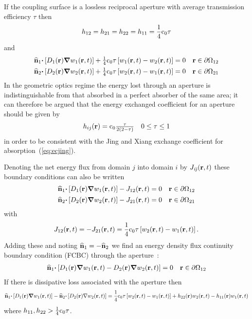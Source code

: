 \documentclass[a4paper]{article}
\numberwithin{equation}{section}
\begin{document}
If the coupling surface is a lossless reciprocal aperture with average
transmission efficiency $\tau$ then
\begin{align}
h_{12} = h_{21} = h_{22} = h_{11} = \frac{1}{4}\rc_0\tau
\end{align}
and
\begin{align}
\begin{matrix}
\uvn_1{\vcdot}\left[D_1\pr{\vnabla}w_1\prt\right]+\frac{1}{4}\rc_0\tau\left[w_1\prt-w_2\prt\right]=0 &\vr\in\partial\Omega_{12}
\end{matrix}\\
\begin{matrix}
\uvn_2{\vcdot}\left[D_2\pr{\vnabla}w_2\prt\right]+\frac{1}{4}\rc_0\tau\left[w_2\prt-w_1\prt\right]=0 &\vr\in\partial\Omega_{21}
\end{matrix}
\end{align}
In the geometric optics regime the energy lost through an aperture is indistinguishable from that
absorbed in a perfect absorber of the same area; it can therefore be argued that the energy
exchanged coefficient for an aperture should be given by
\begin{align}
\begin{matrix}
h_{ij}\pr = \rc_0\frac{\tau}{2\left(2-\tau\right)} &0\leq\tau\leq 1
\end{matrix}
\end{align}
in order to be consistent with the Jing and Xiang exchange coefficient for
absorption~(\ref{eq:ecjing}).

Denoting the net energy flux from domain $j$ into domain $i$ by 
$J_{\mathit{ij}}\prt$ these boundary conditions can also be written
\begin{align}
\begin{matrix}
\uvn_1{\vcdot}\left[D_1\pr{\vnabla}w_1\prt\right]-J_{12}\prt=0 &\vr\in\partial\Omega_{12}
\end{matrix}\\
\begin{matrix}
\uvn_2{\vcdot}\left[D_2\pr{\vnabla}w_2\prt\right]-J_{21}\prt=0 &\vr\in\partial\Omega_{21}
\end{matrix}
\end{align}
with
\begin{align}
J_{12}\prt = -J_{21}\prt = \frac{1}{4}\rc_0\tau\left[w_2\prt-w_1\prt\right].
\end{align}
Adding these and noting $\uvn_1=-\uvn_2$ we find an energy density flux continuity
boundary condition (FCBC) through the aperture~\citep{Billon2008}:
\begin{align}
\label{eq:fcbc}
\begin{matrix}
\uvn_1{\vcdot}\left[D_1\pr{\vnabla}w_1\prt-D_2\pr{\vnabla}w_2\prt\right]=0 &\vr\in\partial\Omega_{12}
\end{matrix}
\end{align}
If there is dissipative loss associated with the aperture then
\begin{align}
\uvn_1{\vcdot}\left[D_1\pr{\vnabla}w_1\prt\right]-\uvn_2{\vcdot}\left[D_2\pr{\nabla}w_2\prt\right]=\frac{1}{4}\rc_0\tau
\left[w_2\prt-w_1\prt\right]+h_{22}\pr w_2\prt-h_{11}\pr w_1\prt
\end{align}
where $h_{11},h_{22}>\frac{1}{4}\rc_0\tau$.
\end{document}
